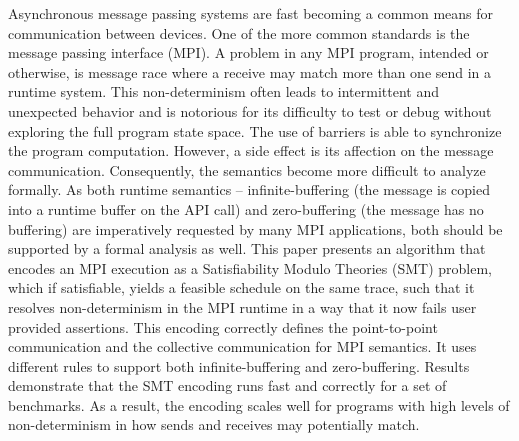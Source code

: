 Asynchronous message passing systems are fast becoming a common means for communication between devices.
%
One of the more common standards is the message passing interface (MPI).
%
A problem in any MPI program, intended or otherwise, is message race where a receive may match more than one send in a runtime system.
%
This non-determinism often leads to intermittent and unexpected behavior and is notorious for its difficulty to test or debug without exploring the full program state space. 
%
The use of barriers is able to synchronize the program computation. 
%
However, a side effect is its affection on the message communication.
%
Consequently, the semantics become more difficult to analyze formally. 
%
As both runtime semantics -- infinite-buffering (the message is copied into a runtime buffer on the API call) and zero-buffering (the message has no buffering) are imperatively requested by many MPI applications, both should be supported by a formal analysis as well. 
%
This paper presents an algorithm that encodes an MPI execution as a Satisfiability Modulo Theories (SMT) problem, which if satisfiable, yields a feasible schedule on the same trace, such that it resolves non-determinism in the MPI runtime in a way that it now fails user provided assertions.
%
This encoding correctly defines the point-to-point communication and the collective communication for MPI semantics.
%
It uses different rules to support both infinite-buffering and zero-buffering.
%
Results demonstrate that the SMT encoding runs fast and correctly for a set of benchmarks. 
%
As a result, the encoding scales well for programs with high levels of non-determinism in how sends and receives may potentially match.